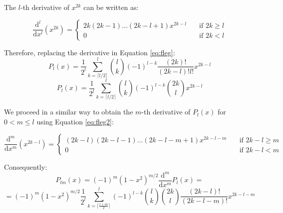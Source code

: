 \documentclass[12pt]{article}
\begin{document}
\begin{appendix}
The $l$-th derivative of $x^{2k}$ can be written as:

\[ \frac{\mathrm{d}^l}{\mathrm{d}x^l}(x^{2k}) =
  \begin{cases}
    2k (2k-1) \ldots (2k-l+1) x^{2k-l}      & \quad \text{if } 2k \ge l \\
    0 & \quad \text{if } 2k < l
  \end{cases}
\]

Therefore, replacing the derivative in Equation \ref{eq:fleg}:
\begin{equation*}
    P_l(x) = \frac{1}{2^l} \sum_{k=\lceil l/2 \rceil}^l {l \choose k} (-1)^{l-k} \frac{(2k)!}{(2k-l)! l!} x^{2k-l}
\end{equation*}
\begin{equation}
    \label{eq:fleg2}
    P_l(x) = \frac{1}{2^l} \sum_{k=\lceil l/2 \rceil}^l {l \choose k} (-1)^{l-k} {2k \choose l} x^{2k-l}
\end{equation}

We proceed in a similar way to obtain the $m$-th derivative of $P_l(x)$ for $0 < m \le l$ using Equation \ref{eq:fleg2}:

\[ \frac{\mathrm{d}^m}{\mathrm{d}x^m}(x^{2k-l}) =
  \begin{cases}
    (2k-l) (2k-l-1) \ldots (2k-l-m+1) x^{2k-l-m}      & \quad \text{if } 2k-l \ge m \\
    0 & \quad \text{if } 2k -l < m
  \end{cases}
\]

Consequently:
\begin{equation*}
    P_{lm}(x)=(-1)^m (1-x^2)^{m/2} \frac{\mathrm{d}^m}{\mathrm{d}x^m} P_l(x) = 
\end{equation*}
\begin{equation*}
     = (-1)^m (1-x^2)^{m/2} \frac{1}{2^l} \sum_{k = \lceil \frac{l+m}{2} \rceil}^{l} (-1)^{l-k} {l \choose k} {2k \choose l} \frac{(2k-l)!}{(2k-l-m)!} x^{2k-l-m}
\end{equation*}

\end{appendix}
\end{document}
